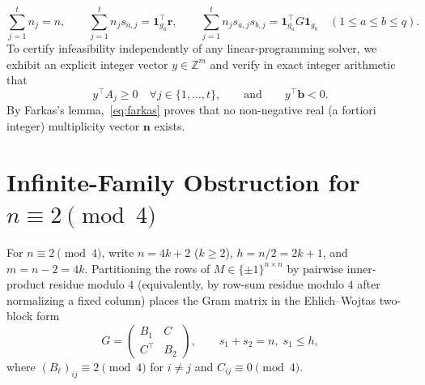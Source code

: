 \documentclass[11pt]{article}
\theoremstyle{remark}
\newcommand{\Z}{\mathbb{Z}}
\begin{document}
\begin{enumerate}[leftmargin=*,topsep=3pt,itemsep=2pt]
\[
  \sum_{j=1}^t n_j = n, \qquad
  \sum_{j=1}^t n_j s_{a,j} = \mathbf{1}_{g_a}^\top \mathbf{r}, \qquad
  \sum_{j=1}^t n_j s_{a,j} s_{b,j} = \mathbf{1}_{g_a}^\top G \mathbf{1}_{g_b} \quad (1 \le a \le b \le q).
\]
To certify infeasibility independently of any linear-programming solver, we exhibit an explicit integer vector $y \in \Z^m$ and verify in exact integer arithmetic that
\begin{equation}\label{eq:farkas}
  y^\top A_j \ge 0 \quad \forall j \in \{1, \dots, t\}, \qquad\text{and}\qquad y^\top \mathbf{b} < 0.
\end{equation}
By Farkas's lemma,~\eqref{eq:farkas} proves that no non-negative real (a fortiori integer) multiplicity vector $\mathbf{n}$ exists.
\end{enumerate}

\section{Infinite-Family Obstruction for \texorpdfstring{$n \equiv 2 \pmod 4$}{n = 2 (mod 4)}}\label{sec:k2k2}

For $n \equiv 2 \pmod 4$, write $n = 4k + 2$ ($k \ge 2$), $h = n/2 = 2k + 1$, and $m = n - 2 = 4k$. Partitioning the rows of $M \in \{\pm 1\}^{n \times n}$ by pairwise inner-product residue modulo $4$ (equivalently, by row-sum residue modulo $4$ after normalizing a fixed column) places the Gram matrix in the Ehlich--Wojtas two-block form~\cite{ehlich1964a,wojtas1964}
\begin{equation}\label{eq:twoblock}
  G = \begin{pmatrix} B_1 & C \\ C^\top & B_2 \end{pmatrix}, \qquad s_1 + s_2 = n, \; s_1 \le h,
\end{equation}
where $(B_\ell)_{ij} \equiv 2 \pmod 4$ for $i \ne j$ and $C_{ij} \equiv 0 \pmod 4$.
\end{document}
